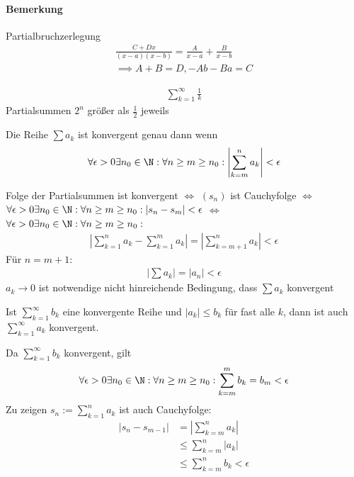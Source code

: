 \paragraph{Bemerkung} Partialbruchzerlegung\\
\begin{align*}
	\frac{C+Dx}{(x-a)(x-b)}=\frac{A}{x-a}+\frac{B}{x-b}\\
	\implies A+B= D, -Ab-Ba=C
\end{align*}
\begin{example}
	\begin{align*}
		\sum\limits_{k=1}^{\infty}\frac{1}{k}
	\end{align*}
	Partialsummen $2^n$ größer als $\frac{1}{2}$ jeweils 
\end{example}
\begin{theorem}
	Die Reihe $\sum a_k$ ist konvergent genau dann wenn
	\begin{align*}
		\forall \epsilon >0 \exists n_0\in \N: \forall n \geq m\geq n_0: \left|\sum\limits_{k=m}^n a_k\right|< \epsilon
	\end{align*}
\end{theorem}
\prove Folge der Partialsummen ist konvergent $\iff$ $(s_n)$ ist Cauchyfolge $\iff$ $\forall \epsilon > 0 \exists n_0 \in \N: \forall n \geq m \geq n_0: |s_n-s_m| < \epsilon$ $\iff$ $\forall \epsilon > 0 \exists n_0 \in \N: \forall n \geq m \geq n_0:$
\begin{align*}
	\left|\sum\limits_{k=1}^n a_k - \sum\limits_{k=1}^m a_k\right| = \left|\sum\limits_{k=m+1}^n a_k\right| < \epsilon
\end{align*}
Für $n=m+1$:
\begin{align*}
	\left|\sum a_k\right|=|a_n|<\epsilon
\end{align*}
$a_k \to 0$ ist notwendige nicht hinreichende Bedingung, dass $\sum a_k$ konvergent
\begin{theorem}[Majorantenkriterium]
	Ist $\sum\limits_{k=1}^{\infty} b_k$ eine konvergente Reihe und $|a_k|\leq b_k$ für fast alle $k$, dann ist auch $\sum\limits_{k=1}^{\infty}a_k$ konvergent.
\end{theorem}
\prove Da $\sum\limits_{k=1}^{\infty}b_k$ konvergent, gilt 
\begin{align*}
	\forall \epsilon > 0 \exists n_0 \in \N: \forall n \geq m \geq n_0: \sum\limits_{k=m}^{m} b_k = b_m < \epsilon
\end{align*}
Zu zeigen $s_n:= \sum\limits_{k=1}^n a_k$ ist auch Cauchyfolge:
\begin{align*}
	|s_n-s_{m-1}|&=|\sum\limits_{k=m}^n a_k|\\&\leq \sum\limits_{k=m}^n |a_k|\\
	&\leq \sum\limits_{k=m}^n b_k < \epsilon
\end{align*} 





